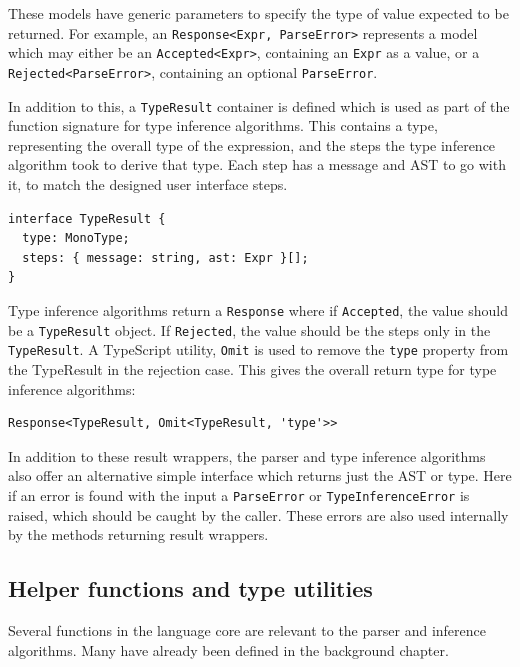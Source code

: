 \documentclass[a4paper,fleqn,oneside,12pt]{report}
\begin{document}
These models have generic parameters to specify the type of value expected to be returned. For example, an \texttt{Response<Expr, ParseError>} represents a model which may either be an \texttt{Accepted<Expr>}, containing an \texttt{Expr} as a value, or a \texttt{Rejected<ParseError>}, containing an optional \texttt{ParseError}.

In addition to this, a \texttt{TypeResult} container is defined which is used as part of the function signature for type inference algorithms. This contains a type, representing the overall type of the expression, and the steps the type inference algorithm took to derive that type. Each step has a message and AST to go with it, to match the designed user interface steps.

\begin{verbatim}
interface TypeResult {
  type: MonoType;
  steps: { message: string, ast: Expr }[];
}
\end{verbatim}

Type inference algorithms return a \texttt{Response} where if \texttt{Accepted}, the value should be a \texttt{TypeResult} object. If \texttt{Rejected}, the value should be the steps only in the \texttt{TypeResult}. A TypeScript utility, \texttt{Omit} is used to remove the \texttt{type} property from the TypeResult in the rejection case. This gives the overall return type for type inference algorithms:

\begin{verbatim}
Response<TypeResult, Omit<TypeResult, 'type'>>
\end{verbatim}
In addition to these result wrappers, the parser and type inference algorithms also offer an alternative simple interface which returns just the AST or type. Here if an error is found with the input a \texttt{ParseError} or \texttt{TypeInferenceError} is raised, which should be caught by the caller. These errors are also used internally by the methods returning result wrappers.

\subsection{Helper functions and type utilities}\label{id:h.sw77qek8b49p}

Several functions in the language core are relevant to the parser and inference algorithms. Many have already been defined in the background chapter.
\end{document}
